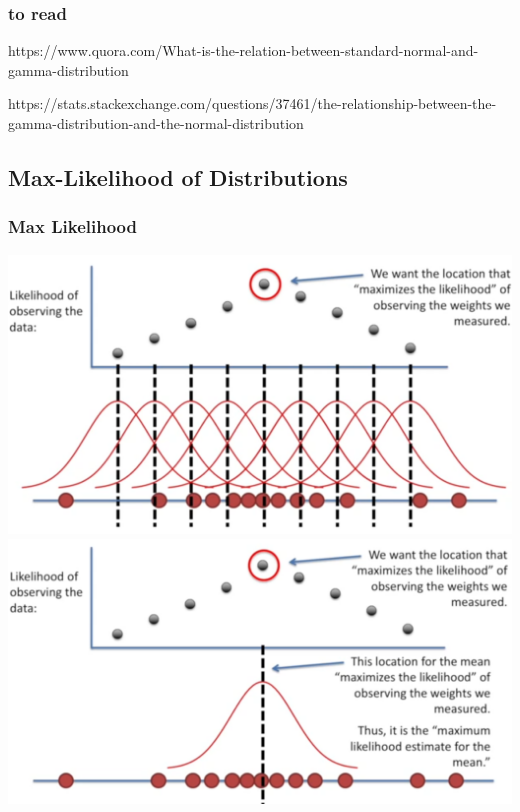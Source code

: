 \documentclass{beamer}
\begin{document}
\begin{frame}\frametitle{to read}
https://www.quora.com/What-is-the-relation-between-standard-normal-and-gamma-distribution

https://stats.stackexchange.com/questions/37461/the-relationship-between-the-gamma-distribution-and-the-normal-distribution

\end{frame}





\subsection{Max-Likelihood of Distributions}
\begin{frame}\frametitle{Max Likelihood}
	\includegraphics[scale=0.15]{figs/likelihoodmean}	\includegraphics[scale=0.15]{figs/likelihoodmean2}\\

\end{frame}
\end{document}
